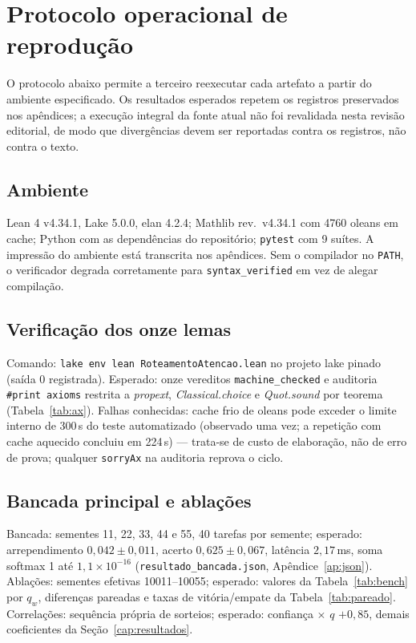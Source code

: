 \section{Protocolo operacional de reprodução}
O protocolo abaixo permite a terceiro reexecutar cada artefato a partir do ambiente especificado. Os resultados esperados repetem os registros preservados nos apêndices; a execução integral da fonte atual não foi revalidada nesta revisão editorial, de modo que divergências devem ser reportadas contra os registros, não contra o texto.
\subsection{Ambiente}
Lean 4 v4.34.1, Lake 5.0.0, elan 4.2.4; Mathlib rev.\ v4.34.1 com 4760 oleans em cache; Python com as dependências do repositório; \texttt{pytest} com 9 suítes. A impressão do ambiente está transcrita nos apêndices. Sem o compilador no \texttt{PATH}, o verificador degrada corretamente para \texttt{syntax\_verified} em vez de alegar compilação.
\subsection{Verificação dos onze lemas}
Comando: \nolinkurl{lake env lean RoteamentoAtencao.lean} no projeto lake pinado (saída 0 registrada). Esperado: onze vereditos \texttt{machine\_checked} e auditoria \texttt{\#print axioms} restrita a \textit{propext}, \textit{Classical.choice} e \textit{Quot.sound} por teorema (Tabela~\ref{tab:ax}). Falhas conhecidas: cache frio de oleans pode exceder o limite interno de 300\,s do teste automatizado (observado uma vez; a repetição com cache aquecido concluiu em 224\,s) --- trata-se de custo de elaboração, não de erro de prova; qualquer \texttt{sorryAx} na auditoria reprova o ciclo.
\subsection{Bancada principal e ablações}
Bancada: sementes 11, 22, 33, 44 e 55, 40 tarefas por semente; esperado: arrependimento $0{,}042\pm0{,}011$, acerto $0{,}625\pm0{,}067$, latência $2{,}17$\,ms, soma softmax 1 até $1{,}1\times10^{-16}$ (\nolinkurl{resultado_bancada.json}, Apêndice~\ref{ap:json}). Ablações: sementes efetivas 10011--10055; esperado: valores da Tabela~\ref{tab:bench} por $q_w$, diferenças pareadas e taxas de vitória/empate da Tabela~\ref{tab:pareado}. Correlações: sequência própria de sorteios; esperado: confiança $\times$ $q$ $+0{,}85$, demais coeficientes da Seção~\ref{cap:resultados}.
